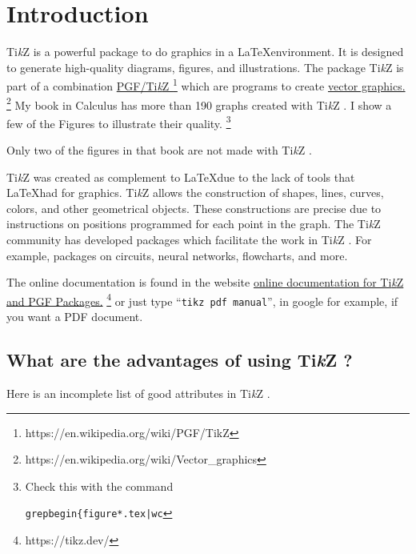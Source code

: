 \documentclass[12pt]{article}
\newcommand{\myTikZ}{Ti\textit{k}Z }
\newcommand{\myLaTeX}{\LaTeX \space  }
\begin{document}
\maketitle

\section{Introduction}
\myTikZ is a powerful package to do graphics in a \myLaTeX environment.
It is designed to generate high-quality diagrams, figures, and illustrations. 
The package \myTikZ is part of a combination 
\href{https://en.wikipedia.org/wiki/PGF/TikZ}{PGF/\myTikZ}
\footnote{https://en.wikipedia.org/wiki/PGF/TikZ}
which are programs to create 
\href{https://en.wikipedia.org/wiki/Vector_graphics}{vector graphics.}
\footnote{https://en.wikipedia.org/wiki/Vector\_graphics}
My book in Calculus has more than 190 graphs created with \myTikZ.  I show a few of the
Figures to illustrate their quality.
\footnote{Check this with the command 
  \begin{alltt}
    \hspace{2in} grep begin\{figure *.tex | wc
  \end{alltt}
}

Only two of the figures in that book are not made with \myTikZ.

\myTikZ was created as complement to \myLaTeX due to the lack of tools that \myLaTeX had
for graphics. \myTikZ allows the construction of shapes, lines, curves, colors, and other
geometrical objects.  These constructions are precise due to instructions on positions
programmed for each point in the graph. The \myTikZ community has developed packages
which facilitate the work in \space \myTikZ. For example, packages on circuits, neural networks,
flowcharts, and more.

The online documentation is found  in the website
\href{https://tikz.dev/}{online documentation for \myTikZ and PGF Packages.}
\footnote{https://tikz.dev/}
or just type ``\texttt{tikz pdf manual}'', in google for example, if you want a PDF document.



\subsection{What are the advantages of using \myTikZ ?}
Here is an incomplete list of good attributes in \myTikZ.
\end{document}
